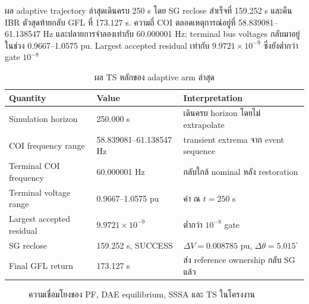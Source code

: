 \documentclass[12pt,a4paper]{article}
\begin{document}
ผล adaptive trajectory ล่าสุดเดินครบ 250 s โดย SG reclose สำเร็จที่ 159.252 s และคืน IBR ตัวสุดท้ายกลับ GFL ที่ 173.127 s. ความถี่ COI ตลอดเหตุการณ์อยู่ที่ 58.839081--61.138547 Hz และปลายการจำลองเท่ากับ 60.000001 Hz; terminal bus voltages กลับมาอยู่ในช่วง 0.9667--1.0575 pu. Largest accepted residual เท่ากับ $9.9721\times10^{-9}$ ซึ่งยังต่ำกว่า gate $10^{-8}$
\begin{table}[H]
\centering
\caption{ผล TS หลักของ adaptive arm ล่าสุด}
\begin{tabularx}{0.94\textwidth}{@{}l l X@{}}
\toprule
Quantity & Value & Interpretation \\
\midrule
Simulation horizon & 250.000 s & เดินครบ horizon โดยไม่ extrapolate \\
COI frequency range & 58.839081--61.138547 Hz & transient extrema จาก event sequence \\
Terminal COI frequency & 60.000001 Hz & กลับใกล้ nominal หลัง restoration \\
Terminal voltage range & 0.9667--1.0575 pu & ค่า ณ $t=250$ s \\
Largest accepted residual & $9.9721\times10^{-9}$ & ต่ำกว่า $10^{-8}$ gate \\
SG reclose & 159.252 s, SUCCESS & $\Delta V=0.008785$ pu, $\Delta\theta=5.015^{\circ}$ \\
Final GFL return & 173.127 s & ส่ง reference ownership กลับ SG แล้ว \\
\bottomrule
\end{tabularx}
\end{table}

\begin{figure}[H]
\centering
{}
\caption{ความเชื่อมโยงของ PF, DAE equilibrium, SSSA และ TS ในโครงงาน}
\end{figure}
\end{document}
